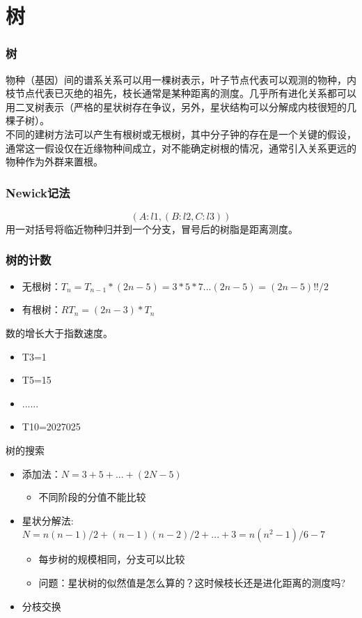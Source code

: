 \documentclass{beamer}
\begin{document}
\section{树}
\begin{frame}
\frametitle{树}
物种（基因）间的谱系关系可以用一棵树表示，叶子节点代表可以观测的物种，内枝节点代表已灭绝的祖先，枝长通常是某种距离的测度。几乎所有进化关系都可以用二叉树表示（严格的星状树存在争议，另外，星状结构可以分解成内枝很短的几棵子树）。\\
不同的建树方法可以产生有根树或无根树，其中分子钟的存在是一个关键的假设，通常这一假设仅在近缘物种间成立，对不能确定树根的情况，通常引入关系更远的物种作为外群来置根。\\
\end{frame}
\begin{frame}
\frametitle{Newick记法}
$$(A:l1,(B:l2,C:l3))$$
用一对括号将临近物种归并到一个分支，冒号后的树脂是距离测度。
\end{frame}
\begin{frame}
\frametitle{树的计数}
\begin{itemize}
\item 无根树：$T_n=T_{n-1}*(2n-5)=3*5*7...(2n-5)=(2n-5)!!/2$
\item 有根树：$RT_n=(2n-3)*T_n$
\end{itemize}
数的增长大于指数速度。\\
\begin{itemize}
\item T3=1
\item T5=15
\item ......
\item T10=2027025
\end{itemize}
\end{frame}

\begin{frame}{树的搜索}
\begin{itemize}
    \item 添加法：$N=3+5+...+(2N-5)$
    \begin{itemize}
    		\item 不同阶段的分值不能比较
    \end{itemize}
    \item 星状分解法:$N=n(n-1)/2+(n-1)(n-2)/2+...+3=n(n^2-1)/6-7$
    \begin{itemize}
        \item 每步树的规模相同，分支可以比较
        \item 问题：星状树的似然值是怎么算的？这时候枝长还是进化距离的测度吗?
    \end{itemize}
		\item 分枝交换
\end{itemize}
\end{frame}
\end{document}

